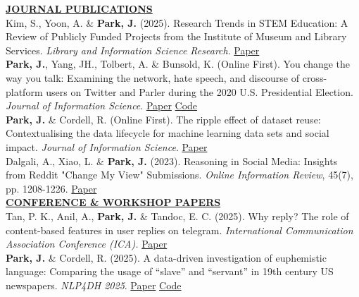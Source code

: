 \documentclass{article}
\begin{document}
\noindent \textbf{\underline{JOURNAL PUBLICATIONS}} \\
\noindent Kim, S., Yoon, A. \& \textbf{Park, J.} (2025). Research Trends in STEM Education: A Review of Publicly Funded Projects from the Institute of Museum and Library Services. \textit{Library and Information Science Research}. \hfill \href{https://www.sciencedirect.com/science/article/abs/pii/S0740818825000295}{Paper} \\

\noindent \textbf{Park, J.}, Yang, JH., Tolbert, A. \& Bunsold, K. (Online First). You change the way you talk: Examining the network, hate speech, and discourse of cross-platform users on Twitter and Parler during the 2020 U.S. Presidential Election. \textit{Journal of Information Science}. \hfill \href{https://journals.sagepub.com/doi/abs/10.1177/01655515241238405}{Paper} \href{https://github.com/park-jay/cross-platform}{Code} \\ 

\noindent \textbf{Park, J.} \& Cordell, R. (Online First). The ripple effect of dataset reuse: Contextualising the data lifecycle for machine learning data sets and social impact. \textit{Journal of Information Science}. \hfill \href{https://journals.sagepub.com/doi/abs/10.1177/01655515231212977}{Paper} \\

\noindent Dalgali, A., Xiao, L. \& \textbf{Park, J.} (2023). Reasoning in Social Media: Insights from Reddit "Change My View" Submissions. \textit{Online Information Review}, 45(7), pp. 1208-1226. \hfill \href{https://www.emerald.com/insight/content/doi/10.1108/OIR-08-2020-0330/full/html}{Paper} \\

\noindent \textbf{\underline{CONFERENCE \& WORKSHOP PAPERS}} \\ 
\noindent Tan, P. K., Anil, A., \textbf{Park, J.} \& Tandoc, E. C. (2025). Why reply? The role of content-based features in user replies on telegram. \textit{International Communication Association Conference (ICA).} \hfill \href{https://dr.ntu.edu.sg/entities/publication/ca749a43-3057-4714-9cc5-8fdb5cae5110}{Paper} \\

\noindent \textbf{Park, J.} \& Cordell, R. (2025). A data-driven investigation of euphemistic language: Comparing the usage of ``slave'' and ``servant'' in 19th century US newspapers. \textit{NLP4DH 2025}. \hfill \href{https://aclanthology.org/anthology-files/anthology-files/pdf/nlp4dh/2025.nlp4dh-1.31.pdf}{Paper} \href{https://github.com/park-jay/slavery-discourse}{Code} \\
\end{document}
